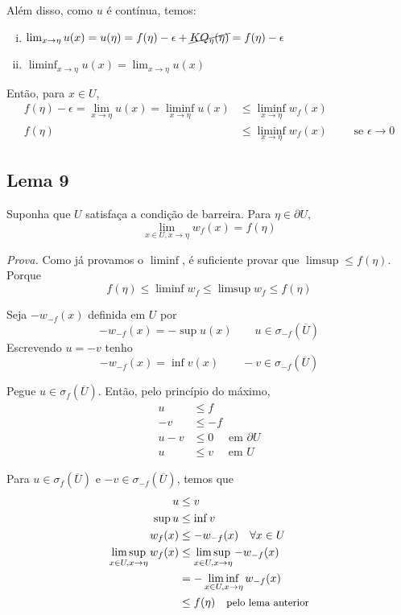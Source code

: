\documentclass[11pt]{article}
\newcommand{\p}{\partial}
\newcommand{\e}{\epsilon}
\newcommand{\rarrow}{\rightarrow}
\begin{document}
Além disso, como \(u\) é contínua, temos:\begin{enumerate}[(i)]
	\item \(\lim_{x \rightarrow \eta} u(x) = u(\eta) = f(\eta) - \e + \cancel{K Q_\eta(\eta)} = f(\eta) - \e\) 
	\item \(\liminf_{x \rightarrow \eta} u(x) = \lim_{x \rightarrow \eta} u(x) \)
\end{enumerate}

Então, para \(x \in U\),
\begin{align*}
	f(\eta) - \e = \lim_{x \rightarrow \eta} u(x) = \liminf_{x \rightarrow \eta} u(x) &\leq \liminf_{x \rightarrow \eta}  w_f(x) \\
	f(\eta) &\leq  \liminf_{x \rightarrow \eta} w_f(x) \qquad \text{ se } \e \rarrow 0 
\end{align*}

\subsection*{Lema 9}

Suponha que \(U\) satisfaça a condição de barreira.
Para \(\eta \in \p U\), \[\lim_{x \in U, x \rightarrow \eta} w_f(x) = f(\eta)\]

\textit{Prova.} Como já provamos o \(\liminf\), é suficiente provar que \(\limsup \leq f(\eta)\). Porque \[f(\eta) \leq \liminf w_f \leq \limsup w_f \leq f(\eta)\]

Seja \(-w_{-f}(x)\) definida em \(U\) por \[-w_{-f}(x) = - \sup u(x) \qquad u \in \sigma_{-f}(\overline{U})\]
Escrevendo \(u=-v\) tenho \[-w_{-f}(x) = \inf v(x) \qquad -v \in \sigma_{-f}(\overline{U})\]

Pegue \(u \in \sigma_f(\overline{U})\). Então, pelo princípio do máximo, \begin{align*}
	u &\leq f \\
	-v &\leq -f \\
	u-v&\leq 0 \quad \text{ em } \p U \\
	u &\leq v \quad \text{ em } U 
\end{align*}

Para \(u \in \sigma_f(\overline{U})\) e \(-v \in \sigma_{-f}(\overline{U})\), temos que \begin{align*}
	u &\leq v \\
	\sup u &\leq \inf v \\
	w_f(x) &\leq -w_{-f}(x) \quad \forall x \in U \\
	\limsup_{x \in U, x \rightarrow \eta}  w_f(x) &\leq \limsup_{x \in U, x \rightarrow \eta} -w_{-f}(x) \\
	&=- \liminf_{x \in U, x \rightarrow \eta} w_{-f}(x) \\
	&\leq f(\eta) \quad \text{\small pelo lema anterior}
\end{align*}
\end{document}
